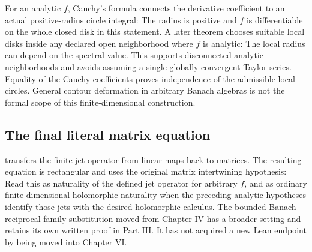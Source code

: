 For an analytic $f$, Cauchy's formula connects the derivative coefficient to an actual positive-radius circle integral:
The radius is positive and $f$ is differentiable on the whole closed disk in this statement. A later theorem chooses suitable local disks inside any declared open neighborhood where $f$ is analytic:
The local radius can depend on the spectral value. This supports disconnected analytic neighborhoods and avoids assuming a single globally convergent Taylor series. Equality of the Cauchy coefficients proves independence of the admissible local circles. General contour deformation in arbitrary Banach algebras is not the formal scope of this finite-dimensional construction.

\subsection{The final literal matrix equation}
 transfers the finite-jet operator from linear maps back to matrices. The resulting equation is rectangular and uses the original matrix intertwining hypothesis:
Read this as naturality of the defined jet operator for arbitrary $f$, and as ordinary finite-dimensional holomorphic naturality when the preceding analytic hypotheses identify those jets with the desired holomorphic calculus. The bounded Banach reciprocal-family substitution moved from Chapter IV has a broader setting and retains its own written proof in Part III. It has not acquired a new Lean endpoint by being moved into Chapter VI.

